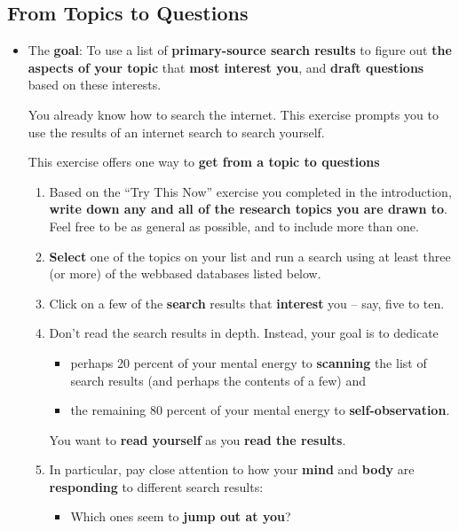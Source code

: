 \documentclass[11pt]{article}
\begin{document}
\subsection{From Topics to Questions}
\begin{itemize}
\item \begin{exercise}

The \textbf{goal}: To use a list of \textbf{primary-source search results} to figure out \textbf{the aspects of your topic} that \textbf{most interest you}, and \textbf{draft questions} based on these interests.

You already know how to search the internet. This exercise prompts you to use the results of an internet search to search yourself.

This exercise offers one way to \textbf{get from a topic to questions}
\begin{enumerate}
\item  Based on the “Try This Now” exercise you completed in the introduction, \textbf{write down any and all of the research topics you are drawn to}. Feel free to be as general as possible, and to include more than one.

\item \textbf{Select} one of the topics on your list and run a search using at least three (or more) of the webbased databases listed below. 

\item Click on a few of the \textbf{search} results that \textbf{interest} you -- say, five to ten.

\item Don’t read the search results in depth. Instead, your goal is to dedicate 
\begin{itemize}
\item  perhaps 20 percent of your mental energy to \textbf{scanning} the list of search results (and perhaps the contents of a few) and
\item the remaining 80 percent of your mental energy to \textbf{self-observation}. 
\end{itemize} You want to \textbf{read yourself} as you \textbf{read the results}.

\item In particular, pay close attention to how your \textbf{mind} and \textbf{body} are \textbf{responding} to different search results:
\begin{itemize}
\item Which ones seem to \textbf{jump out at you}? 


\end{itemize}
\end{enumerate}
\end{exercise}
\end{itemize}
\end{document}
